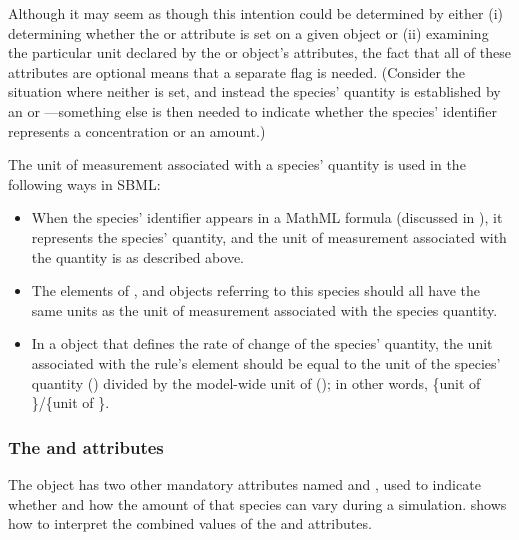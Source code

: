 Although it may seem as though this intention could be determined
by either (i) determining whether the
 or  attribute is
set on a given \Species object or (ii) examining the particular
unit declared by the \Species or \Model object's
 attributes, the fact that all of these
attributes are optional means that a separate flag is needed.
(Consider the situation where neither is set, and instead the
species' quantity is established by an \InitialAssignment or
\AssignmentRule---something else is then needed to indicate
whether the species' identifier represents a concentration or an
amount.)

The unit of measurement associated with a species' quantity is
used in the following ways in SBML:
\begin{itemize}

\item When the species' identifier appears in a MathML formula
  (discussed in ), it represents the
  species' quantity, and the unit of measurement associated with
  the quantity is as described above.

\item The  elements of \AssignmentRule,
  \InitialAssignment and \EventAssignment objects referring to
  this species should all have the same units as the unit of
  measurement associated with the species quantity.

\item In a \RateRule object that defines the rate of change of the
  species' quantity, the unit associated with the rule's
   element should be equal to the unit of the species'
  quantity () divided by the
  model-wide unit of 
  (); in other words, \{unit of
  \}/\{unit of \}.

\end{itemize}


\subsubsection{The  and  attributes}
\label{sec:species-constant}

The \Species object has two other mandatory  attributes
named  and , used to
indicate whether and how the amount of that species can vary
during a simulation.   shows how to
interpret the combined values of the  and
 attributes.

